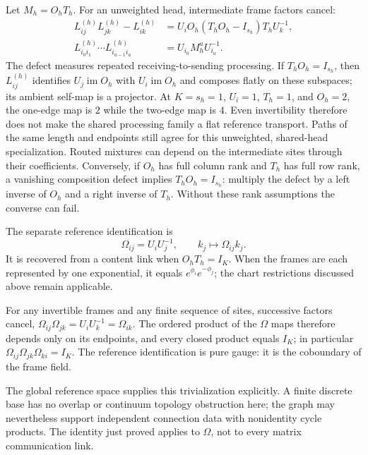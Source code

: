 \documentclass[twoside,11pt]{article}
\begin{document}
Let $M_h=O_hT_h$. For an unweighted head, intermediate frame factors cancel:
\begin{align}
L_{ij}^{(h)}L_{jk}^{(h)}-L_{ik}^{(h)}
&=U_iO_h(T_hO_h-I_{s_h})T_hU_k^{-1},\\
L_{i_0i_1}^{(h)}\cdots L_{i_{a-1}i_a}^{(h)}
&=U_{i_0}M_h^aU_{i_a}^{-1}.
\label{eq:main_link_composition}
\end{align}
The defect measures repeated receiving-to-sending processing. If $T_hO_h=I_{s_h}$, then $L_{ij}^{(h)}$ identifies $U_j\operatorname{im}O_h$ with $U_i\operatorname{im}O_h$ and composes flatly on these subspaces; its ambient self-map is a projector. At $K=s_h=1$, $U_i=1$, $T_h=1$, and $O_h=2$, the one-edge map is $2$ while the two-edge map is $4$. Even invertibility therefore does not make the shared processing family a flat reference transport. Paths of the same length and endpoints still agree for this unweighted, shared-head specialization. Routed mixtures can depend on the intermediate sites through their coefficients. Conversely, if \(O_h\) has full column rank and \(T_h\) has full row rank, a vanishing composition defect implies \(T_hO_h=I_{s_h}\): multiply the defect by a left inverse of \(O_h\) and a right inverse of \(T_h\). Without these rank assumptions the converse can fail.

The separate reference identification is
\begin{equation}
\Omega_{ij}=U_iU_j^{-1},\qquad
k_j\mapsto\Omega_{ij}k_j.
\label{eq:gauge_frame_rotation}
\end{equation}
It is recovered from a content link when $O_hT_h=I_K$. When the frames are each represented by one exponential, it equals $e^{\phi_i}e^{-\phi_j}$; the chart restrictions discussed above remain applicable.
\begin{remark}
\label{rem:flat_identification}
For any invertible frames and any finite sequence of sites, successive factors cancel, $\Omega_{ij}\Omega_{jk}=U_iU_k^{-1}=\Omega_{ik}$. The ordered product of the $\Omega$ maps therefore depends only on its endpoints, and every closed product equals $I_K$; in particular $\Omega_{ij}\Omega_{jk}\Omega_{ki}=I_K$. The reference identification is pure gauge: it is the coboundary of the frame field.
\end{remark}
The global reference space supplies this trivialization explicitly. A finite discrete base has no overlap or continuum topology obstruction here; the graph may nevertheless support independent connection data with nonidentity cycle products. The identity just proved applies to $\Omega$, not to every matrix communication link.
\end{document}
